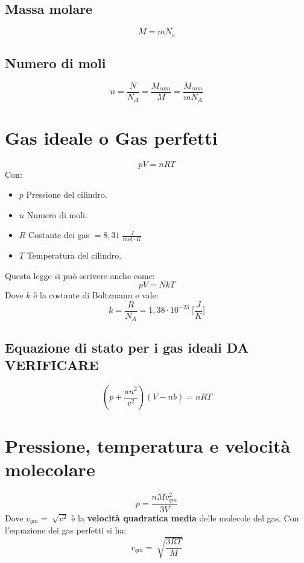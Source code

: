         \subsection*{Massa molare}
            \begin{equation*}
                M = mN_a
            \end{equation*}
        
        \subsection*{Numero di moli}
            \begin{equation*}
                n = \frac{N}{N_A} = \frac{M_{cam}}{M} = \frac{M_{cam}}{mN_A}
            \end{equation*}

    \section*{Gas ideale o Gas perfetti} 
        \begin{equation*}
            pV = nRT
        \end{equation*}
    Con:
        \begin{itemize}
            \item $p$ Pressione del cilindro.
            \item $n$ Numero di moli.
            \item $R$ Costante dei gas $= 8,31 \; \frac{J}{mol \cdot K}$
            \item $T$ Temperatura del cilindro.
        \end{itemize}
    Questa legge si può scrivere anche come:
        \begin{equation*}
            pV = NkT
        \end{equation*}
    Dove $k$ è la costante di Boltzmann e vale:
        \begin{equation*}
            k = \frac{R}{N_A} = 1,38 \cdot 10^{-23} \; \Bigg[\frac{J}{K}\Bigg]
        \end{equation*}
        \subsection*{Equazione di stato per i gas ideali DA VERIFICARE}
            \begin{equation*}
                (p + \frac{an^2}{v^2})(V - nb) = nRT
            \end{equation*}

    \section*{Pressione, temperatura e velocità molecolare}
            \begin{equation*}
                p = \frac{nMv^2_{qm}}{3V}
            \end{equation*}
    Dove $v_{qm} = \sqrt[]{v^2}$ è la \textbf{velocità quadratica media} delle
    molecole del gas. Con l'equazione dei gas perfetti si ha:
            \begin{equation*}
                v_{qm} = \sqrt[]{\frac{3RT}{M}}
            \end{equation*}
